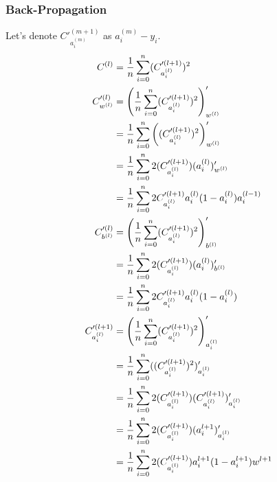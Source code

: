 \documentclass{article}
\begin{document}
\subsubsection{Back-Propagation}
Let's denote $C'^{(m+1)}_{a_i^{(m)}}$ as $a_i^{(m)} - y_i$.
\begin{align}
    C^{(l)}                & = \asum[i, n] (C'^{(l+1)}_{a_i^{(l)}})^2                                     \\
    C'^{(l)}_{w^{(l)}}     & = \left(\asum[i, n] (C'^{(l+1)}_{a_i^{(l)}})^2\right)'_{w^{(l)}}             \\
                           & = \asum[i, n] \left((C'^{(l+1)}_{a_i^{(l)}})^2\right)'_{w^{(l)}}             \\
                           & = \asum[i, n] 2(C'^{(l+1)}_{a_i^{(l)}})(a^{(l)}_i)'_{w^{(l)}}                \\
                           & = \asum[i, n] 2C'^{(l+1)}_{a_i^{(l)}}a^{(l)}_i(1 - a^{(l)}_i)a_i^{(l-1)}     \\
    C'^{(l)}_{b^{(l)}}     & = \left(\asum[i, n] (C'^{(l+1)}_{a_i^{(l)}})^2\right)'_{b^{(l)}}             \\
                           & = \asum[i, n] 2(C'^{(l+1)}_{a_i^{(l)}})(a^{(l)}_i)'_{b^{(l)}}                \\
                           & = \asum[i, n] 2C'^{(l+1)}_{a_i^{(l)}}a^{(l)}_i(1 - a^{(l)}_i)                \\
    C'^{(l+1)}_{a_i^{(l)}} & = \left(\asum[i, n] (C'^{(l+1)}_{a_i^{(l)}})^2\right)'_{a_i^{(l)}}           \\
                           & = \asum[i, n] ((C'^{(l+1)}_{a_i^{(l)}})^2)'_{a_i^{(l)}}                      \\
                           & = \asum[i, n] 2(C'^{(l+1)}_{a_i^{(l)}})(C'^{(l+1)}_{a_i^{(l)}})'_{a_i^{(l)}} \\
                           & = \asum[i, n] 2(C'^{(l+1)}_{a_i^{(l)}})(a_i^{l+1})'_{a_i^{(l)}}              \\
                           & = \asum[i, n] 2(C'^{(l+1)}_{a_i^{(l)}})a_i^{l+1} (1 - a_i^{l+1})w^{l+1}      \\
\end{align}
\end{document}
